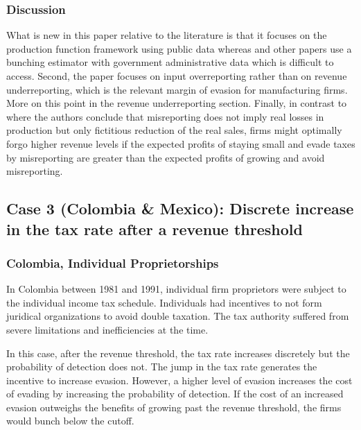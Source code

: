 \documentclass[
  12pt]{article}
\theoremstyle{definition}
\theoremstyle{remark}
\begin{document}
\subsubsection{Discussion}\label{discussion}

What is new in this paper relative to the literature is that it focuses
on the production function framework using public data whereas
\citet{Almunia2018} and other papers use a bunching estimator with
government administrative data which is difficult to access. Second, the
paper focuses on input overreporting rather than on revenue
underreporting, which is the relevant margin of evasion for
manufacturing firms. More on this point in the revenue underreporting
section. Finally, in contrast to \citet{Almunia2018} where the authors
conclude that misreporting does not imply real losses in production but
only fictitious reduction of the real sales, firms might optimally forgo
higher revenue levels if the expected profits of staying small and evade
taxes by misreporting are greater than the expected profits of growing
and avoid misreporting.

\subsection{Case 3 (Colombia \& Mexico): Discrete increase in the tax
rate after a revenue
threshold}\label{case-3-colombia-mexico-discrete-increase-in-the-tax-rate-after-a-revenue-threshold}

\subsubsection{Colombia, Individual
Proprietorships}\label{colombia-individual-proprietorships}

In Colombia between 1981 and 1991, individual firm proprietors were
subject to the individual income tax schedule. Individuals had
incentives to not form juridical organizations to avoid double taxation.
The tax authority suffered from severe limitations and inefficiencies at
the time.

In this case, after the revenue threshold, the tax rate increases
discretely but the probability of detection does not. The jump in the
tax rate generates the incentive to increase evasion. However, a higher
level of evasion increases the cost of evading by increasing the
probability of detection. If the cost of an increased evasion outweighs
the benefits of growing past the revenue threshold, the firms would
bunch below the cutoff.
\end{document}
